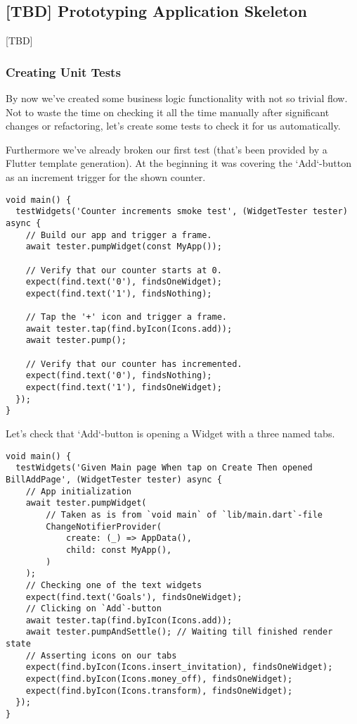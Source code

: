 
\subsection{[TBD] Prototyping Application Skeleton}

[TBD]

\subsubsection{Creating Unit Tests}

By now we've created some business logic functionality with not so trivial flow. Not to waste the time on checking it
all the time manually after significant changes or refactoring, let's create some tests to check it for us automatically.

Furthermore we've already broken our first test (that's been provided by a Flutter template generation). At the 
beginning it was covering the `Add`-button as an increment trigger for the shown counter.

\begin{lstlisting}
void main() {
  testWidgets('Counter increments smoke test', (WidgetTester tester) async {
    // Build our app and trigger a frame.
    await tester.pumpWidget(const MyApp());

    // Verify that our counter starts at 0.
    expect(find.text('0'), findsOneWidget);
    expect(find.text('1'), findsNothing);

    // Tap the '+' icon and trigger a frame.
    await tester.tap(find.byIcon(Icons.add));
    await tester.pump();

    // Verify that our counter has incremented.
    expect(find.text('0'), findsNothing);
    expect(find.text('1'), findsOneWidget);
  });
}
\end{lstlisting}

\noindent Let's check that `Add`-button is opening a Widget with a three named tabs.

\begin{lstlisting}
void main() {
  testWidgets('Given Main page When tap on Create Then opened BillAddPage', (WidgetTester tester) async {
    // App initialization
    await tester.pumpWidget(
        // Taken as is from `void main` of `lib/main.dart`-file
        ChangeNotifierProvider(
            create: (_) => AppData(),
            child: const MyApp(),
        )
    );
    // Checking one of the text widgets
    expect(find.text('Goals'), findsOneWidget);
    // Clicking on `Add`-button
    await tester.tap(find.byIcon(Icons.add));
    await tester.pumpAndSettle(); // Waiting till finished render state
    // Asserting icons on our tabs
    expect(find.byIcon(Icons.insert_invitation), findsOneWidget);
    expect(find.byIcon(Icons.money_off), findsOneWidget);
    expect(find.byIcon(Icons.transform), findsOneWidget);
  });
}
\end{lstlisting}

